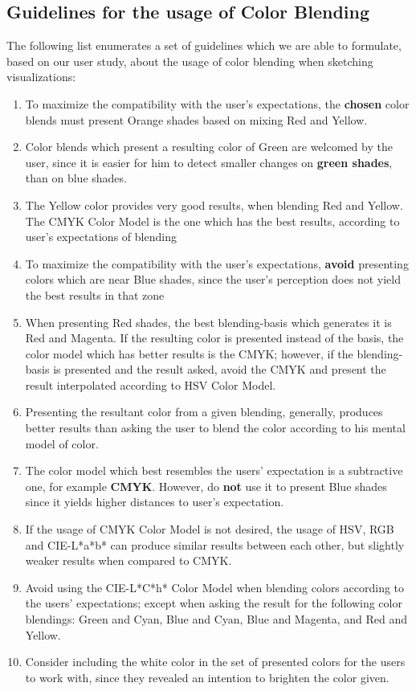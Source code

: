 \subsection{Guidelines for the usage of Color Blending}
\label{subsec:guidelines}
%
The following list enumerates a set of guidelines which we are able to formulate, based on our user study, about the usage of color blending when sketching visualizations:
%
\begin{enumerate}
  \setlength\itemsep{0.01em}
  \item To maximize the compatibility with the user's expectations, the \textbf{chosen} color blends must present Orange shades based on mixing Red and Yellow.
  \item Color blends which present a resulting color of Green are welcomed by the user, since it is easier for him to detect smaller changes on \textbf{green shades}, than on blue shades.
  \item The Yellow color provides very good results, when blending Red and Yellow. The CMYK Color Model is the one which has the best results, according to user's expectations of blending
  \item To maximize the compatibility with the user's expectations, \textbf{avoid} presenting colors which are near Blue shades, since the user's perception does not yield the best results in that zone
  \item When presenting Red shades, the best blending-basis which generates it is Red and Magenta. If the resulting color is presented instead of the basis, the color model which has better results is the CMYK; however,
  if the blending-basis is presented and the result asked, avoid the CMYK and present the result interpolated according to HSV Color Model.
  \item Presenting the resultant color from a given blending, generally, produces better results than asking the user to blend the color according to his mental model of color.
  \item The color model which best resembles the users' expectation is a subtractive one, for example \textbf{CMYK}. However, do \textbf{not} use it to present Blue shades since it yields higher distances to user's expectation.
  \item If the usage of CMYK Color Model is not desired, the usage of HSV, RGB and CIE-L*a*b* can produce similar results between each other, but slightly weaker results when compared to CMYK.
  \item Avoid using the CIE-L*C*h* Color Model when blending colors according to the users' expectations; except when asking the result for the following color blendings: Green and Cyan, Blue and Cyan, Blue and Magenta, and
  Red and Yellow.
  \item Consider including the white color in the set of presented colors for the users to work with, since they revealed an intention to brighten the color given.
\end{enumerate}
%
